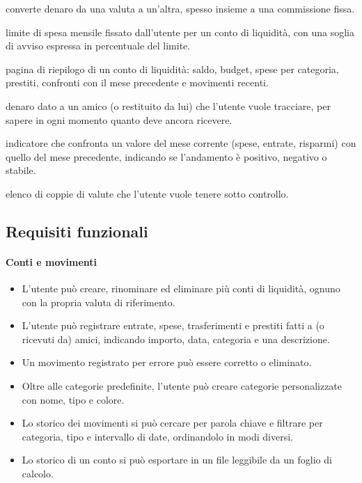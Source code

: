 \documentclass[11pt,a4paper,openright]{report}
\begin{document}
\begin{description}
  converte denaro da una valuta a un'altra, spesso insieme a una commissione fissa.
  \item[Budget] limite di spesa mensile fissato dall'utente per un conto di liquidità, con una soglia di
  avviso espressa in percentuale del limite.
  \item[Dashboard] pagina di riepilogo di un conto di liquidità: saldo, budget, spese per
  categoria, prestiti, confronti con il mese precedente e movimenti recenti.
  \item[Prestito ad amici] denaro dato a un amico (o restituito da lui) che l'utente vuole tracciare, per
  sapere in ogni momento quanto deve ancora ricevere.
  \item[Confronto mensile (insight)] indicatore che confronta un valore del mese corrente (spese, entrate,
  risparmi) con quello del mese precedente, indicando se l'andamento è positivo, negativo o stabile.
  \item[Watchlist] elenco di coppie di valute che l'utente vuole tenere sotto controllo.
\end{description}

\subsection*{Requisiti funzionali}

\paragraph{Conti e movimenti}
\begin{itemize}
  \item L'utente può creare, rinominare ed eliminare più conti di liquidità, ognuno con la propria valuta
  di riferimento.
  \item L'utente può registrare entrate, spese, trasferimenti e prestiti fatti a (o ricevuti da) amici,
  indicando importo, data, categoria e una descrizione.
  \item Un movimento registrato per errore può essere corretto o eliminato.
  \item Oltre alle categorie predefinite, l'utente può creare categorie personalizzate con nome, tipo e
  colore.
  \item Lo storico dei movimenti si può cercare per parola chiave e filtrare per categoria, tipo e
  intervallo di date, ordinandolo in modi diversi.
  \item Lo storico di un conto si può esportare in un file leggibile da un foglio di calcolo.
\end{itemize}
\end{document}
